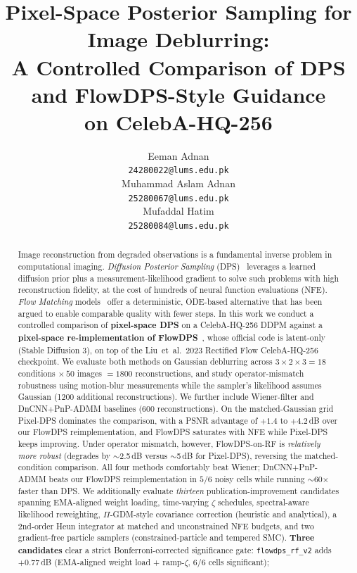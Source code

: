 \documentclass{article}
\title{Pixel-Space Posterior Sampling for Image Deblurring:\\
       A Controlled Comparison of DPS and FlowDPS-Style Guidance\\
       on CelebA-HQ-256}
\author{%
  Eeman Adnan \\
  \texttt{24280022@lums.edu.pk} \\
  \And
  Muhammad Aslam Adnan \\
  \texttt{25280067@lums.edu.pk} \\
  \And
  Mufaddal Hatim \\
  \texttt{25280084@lums.edu.pk} \\
}
\begin{document}
\maketitle

\begin{abstract}
Image reconstruction from degraded observations is a fundamental inverse
problem in computational imaging. \emph{Diffusion Posterior Sampling}
(DPS)~\cite{chung2023dps} leverages a learned diffusion prior plus a
measurement-likelihood gradient to solve such problems with high
reconstruction fidelity, at the cost of hundreds of neural function
evaluations (NFE). \emph{Flow Matching} models~\cite{lipman2023flow,liu2023rectified}
offer a deterministic, ODE-based alternative that has been argued to
enable comparable quality with fewer steps. In this work we conduct a
controlled comparison of \textbf{pixel-space DPS} on a CelebA-HQ-256 DDPM
against a \textbf{pixel-space re-implementation of FlowDPS}~\cite{kim2025flowdps},
whose official code is latent-only (Stable Diffusion 3), on top of the
Liu~et~al.\ 2023 Rectified Flow CelebA-HQ-256 checkpoint. We evaluate
both methods on Gaussian deblurring across $3 \times 2 \times 3 = 18$
conditions $\times\,50$ images $= 1800$ reconstructions, and study
operator-mismatch robustness using motion-blur measurements while the
sampler's likelihood assumes Gaussian (1200 additional reconstructions).
We further include Wiener-filter and DnCNN$+$PnP-ADMM baselines (600
reconstructions). On the matched-Gaussian grid Pixel-DPS dominates the
comparison, with a PSNR advantage of $+1.4$ to $+4.2$\,dB over our
FlowDPS reimplementation, and FlowDPS saturates with NFE while Pixel-DPS
keeps improving. Under operator mismatch, however, FlowDPS-on-RF is
\emph{relatively more robust} (degrades by $\sim$2.5\,dB versus
$\sim$5\,dB for Pixel-DPS), reversing the matched-condition comparison.
All four methods comfortably beat Wiener; DnCNN$+$PnP-ADMM beats our
FlowDPS reimplementation in $5/6$ noisy cells while running $\sim$60$\times$
faster than DPS. We additionally evaluate \emph{thirteen} publication-improvement
candidates spanning EMA-aligned weight loading, time-varying $\zeta$
schedules, spectral-aware likelihood reweighting, $\Pi$-GDM-style
covariance correction (heuristic and analytical), a 2nd-order Heun
integrator at matched and unconstrained NFE budgets, and two
gradient-free particle samplers (constrained-particle and tempered SMC).
\textbf{Three candidates} clear a strict Bonferroni-corrected
significance gate: \texttt{flowdps\_rf\_v2} adds $+0.77$\,dB
(EMA-aligned weight load + ramp-$\zeta$, $6/6$ cells significant);

\end{abstract}
\end{document}
